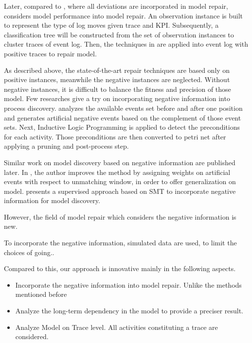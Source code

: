 \documentclass[]{article}
\begin{document}
Later, compared to \cite{fahland2012repairing, fahland2015model}, where all deviations are incorporated in model repair, \cite{dees2017enhancing} considers model performance into model repair. An observation instance is built to represent the type of log moves given trace and  KPI. Subsequently, a classification tree will be constructed from the set of observation instances to cluster traces of event log. Then, the techniques in \cite{fahland2015model} are applied into event log with positive traces to repair model. 


As described above, the state-of-the-art repair techniques are based only on positive instances, meanwhile the negative instances are neglected. Without negative instances, it is difficult to balance the fitness and precision of those model. Few researches give a try on incorporating negative information into process discovery. \cite{goedertier2009robust}  analyzes the available events set before and after one position and generates artificial negative events based on the complement of those event sets. Next, Inductive Logic Programming is applied to detect the preconditions for each activity. Those preconditions are then converted to petri net after applying a pruning and post-process step. 

Similar work on model discovery based on negative information are published later. In \cite{vanden2014determining}, the author improves the method by assigning weights on artificial events with respect to unmatching window, in order to offer generalization on model. \cite{ponce2016incorporating} presents a supervised approach based on SMT to incorporate negative information for model discovery. 

However, the field of model repair which considers the negative information is new. 

To incorporate the negative information, simulated data are used, to limit the choices of going..

Compared to this, our approach is innovative mainly in the following aspects. 
\begin{itemize}
	\item Incorporate the negative information into model repair. Unlike the methods mentioned before
	\item Analyze the long-term dependency in the model to provide a preciser result. 
	\item Analyze Model on Trace level. All activities constituting a trace are considered. 
\end{itemize}
\end{document}

